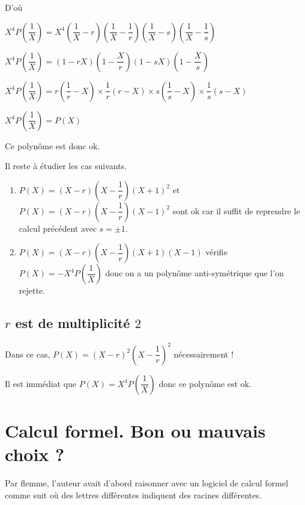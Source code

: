 \documentclass[12pt]{amsart}
\begin{document}
D'où

$X^4 P\left( \dfrac1X \right)
= X^4 
  \left( \dfrac1X - r \right) \left( \dfrac1X - \dfrac1r \right) 
  \left( \dfrac1X - s \right) \left( \dfrac1X - \dfrac1s \right)$

$X^4 P\left( \dfrac1X \right)
= ( 1 - r X) \left( 1 - \dfrac{X}{r} \right) 
  ( 1 - s X) \left( 1 - \dfrac{X}{s} \right)$

$X^4 P\left( \dfrac1X \right)
= r \left( \dfrac1r - X \right) \times \dfrac1r ( r - X) 
  \times s \left( \dfrac1s - X \right) \times \dfrac1s ( s - X)$

$X^4 P\left( \dfrac1X \right)
= P(X)$

Ce polynôme est donc ok.


\bigskip

Il reste à étudier les cas suivants.

\begin{enumerate}
	\item $P(X) = (X - r) \left( X - \dfrac1r \right) (X + 1)^2$ et $P(X) = (X - r) \left( X - \dfrac1r \right) (X - 1)^2$ sont ok car il suffit de reprendre le calcul précédent avec $s = \pm 1$.
	

	\item $P(X) = (X - r) \left( X - \dfrac1r \right) (X + 1) (X - 1)$ vérifie $P(X) = - X^4 P\left( \dfrac1X \right)$ donc on a un polynôme anti-symétrique que l'on rejette.
\end{enumerate}


\subsection*{$r$ est de multiplicité $2$}

Dans ce cas, $P(X) = (X - r)^2 \left( X - \dfrac1r \right)^2$ nécessairement !

Il est immédiat que $P(X) = X^4 P\left( \dfrac1X \right)$ donc ce polynôme est ok.



\section{Calcul formel. Bon ou mauvais choix ?}

Par flemme, l'auteur avait d'abord raisonner avec un logiciel de calcul formel comme suit où des lettres différentes indiquent des racines différentes.
\end{document}
